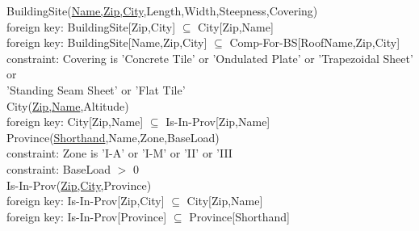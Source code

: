 {{\color{ForestGreen}BuildingSite(\underline{Name,Zip,City},Length,Width,Steepness,Covering)}\\
{\color{Orange}\hspace{2mm} foreign key: {\color{Magenta}BuildingSite[Zip,City] $\subseteq$ City[Zip,Name]}} \\
{\color{Orange}\hspace{2mm} foreign key: {\color{Magenta}BuildingSite[Name,Zip,City] $\subseteq$ Comp-For-BS[RoofName,Zip,City]}} \\
{\color{Orange}\hspace{2mm} constraint: {\color{Magenta}Covering is 'Concrete Tile' or 'Ondulated Plate' or 'Trapezoidal Sheet' or}} \\
{\color{Magenta}\hspace{22.5mm}'Standing Seam Sheet' or 'Flat Tile'}\\

{\color{ForestGreen}City(\underline{Zip,Name},Altitude)}\\
{\color{Orange}\hspace{2mm} foreign key: {\color{Magenta}City[Zip,Name] $\subseteq$ Is-In-Prov[Zip,Name]}} \\

{\color{ForestGreen}Province(\underline{Shorthand},Name,Zone,BaseLoad)}\\
{\color{Orange}\hspace{2mm} constraint: {\color{Magenta}Zone is 'I-A' or 'I-M' or 'II' or 'III}} \\
{\color{Orange}\hspace{2mm} constraint: {\color{Magenta}BaseLoad $>$ 0}} \\

{\color{ForestGreen}Is-In-Prov(\underline{Zip,City},Province)}\\
{\color{Orange}\hspace{2mm} foreign key: {\color{Magenta}Is-In-Prov[Zip,City] $\subseteq$ City[Zip,Name]}} \\
{\color{Orange}\hspace{2mm} foreign key: {\color{Magenta}Is-In-Prov[Province] $\subseteq$ Province[Shorthand]}} \\

}

